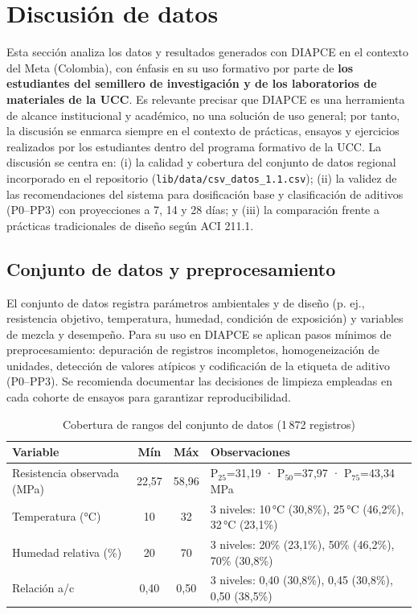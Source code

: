 \section{Discusión de datos}

Esta sección analiza los datos y resultados generados con DIAPCE en el contexto del Meta (Colombia), con énfasis en su uso formativo por parte de \textbf{los estudiantes del semillero de investigación y de los laboratorios de materiales de la UCC}. Es relevante precisar que DIAPCE es una herramienta de alcance institucional y académico, no una solución de uso general; por tanto, la discusión se enmarca siempre en el contexto de prácticas, ensayos y ejercicios realizados por los estudiantes dentro del programa formativo de la UCC. La discusión se centra en: (i) la calidad y cobertura del conjunto de datos regional incorporado en el repositorio (\texttt{lib/data/csv\_datos\_1.1.csv}); (ii) la validez de las recomendaciones del sistema para dosificación base y clasificación de aditivos (P0–PP3) con proyecciones a 7, 14 y 28 días; y (iii) la comparación frente a prácticas tradicionales de diseño según ACI 211.1.

\subsection{Conjunto de datos y preprocesamiento}
El conjunto de datos registra parámetros ambientales y de diseño (p. ej., resistencia objetivo, temperatura, humedad, condición de exposición) y variables de mezcla y desempeño. Para su uso en DIAPCE se aplican pasos mínimos de preprocesamiento: depuración de registros incompletos, homogeneización de unidades, detección de valores atípicos y codificación de la etiqueta de aditivo (P0–PP3). Se recomienda documentar las decisiones de limpieza empleadas en cada cohorte de ensayos para garantizar reproducibilidad.

\begin{table}[H]
  \centering
  \caption{Cobertura de rangos del conjunto de datos (1\,872 registros)}
  \begin{tabular}{lccp{5.5cm}}
    \hline
    Variable & Mín & Máx & Observaciones \\
    \hline
    Resistencia observada (MPa) & 22{,}57 & 58{,}96 & P$_{25}$=31{,}19 · P$_{50}$=37{,}97 · P$_{75}$=43{,}34 MPa \\
    Temperatura (°C) & 10 & 32 & 3 niveles: 10\,°C (30{,}8\%), 25\,°C (46{,}2\%), 32\,°C (23{,}1\%) \\
    Humedad relativa (\%) & 20 & 70 & 3 niveles: 20\% (23{,}1\%), 50\% (46{,}2\%), 70\% (30{,}8\%) \\
    Relación a/c & 0{,}40 & 0{,}50 & 3 niveles: 0{,}40 (30{,}8\%), 0{,}45 (30{,}8\%), 0{,}50 (38{,}5\%) \\
    \hline
  \end{tabular}
\end{table}

